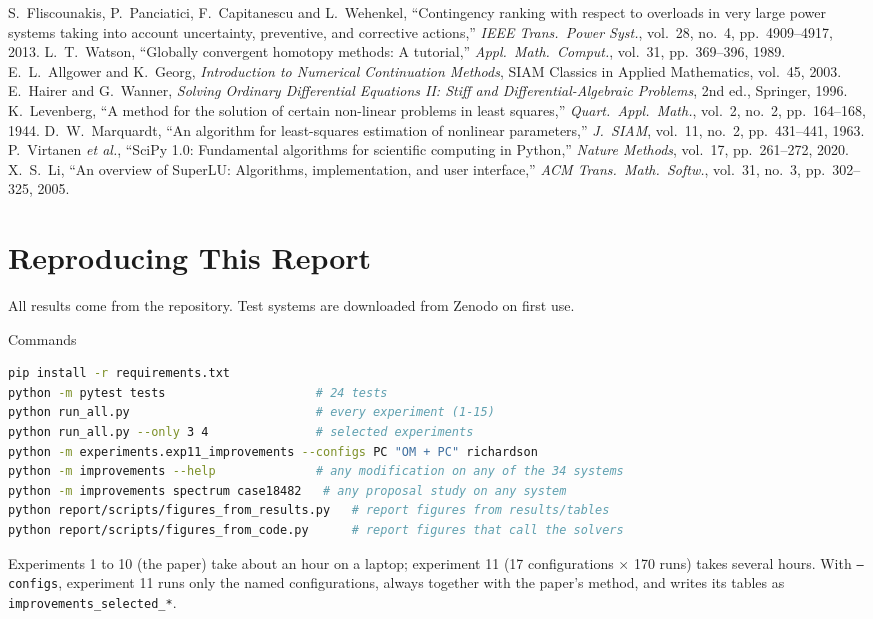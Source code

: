 \documentclass[11pt,a4paper]{article}
\newcommand{\code}[1]{\texttt{#1}}
\begin{document}
\begin{thebibliography}{99}
 S.~Fliscounakis, P.~Panciatici, F.~Capitanescu and L.~Wehenkel, ``Contingency ranking with
  respect to overloads in very large power systems taking into account uncertainty, preventive, and
  corrective actions,'' \emph{IEEE Trans.\ Power Syst.}, vol.~28, no.~4, pp.~4909--4917, 2013.
 L.~T.~Watson, ``Globally convergent homotopy methods: A tutorial,'' \emph{Appl.\ Math.\
  Comput.}, vol.~31, pp.~369--396, 1989.
 E.~L.~Allgower and K.~Georg, \emph{Introduction to Numerical Continuation Methods},
  SIAM Classics in Applied Mathematics, vol.~45, 2003.
 E.~Hairer and G.~Wanner, \emph{Solving Ordinary Differential Equations II: Stiff and
  Differential-Algebraic Problems}, 2nd ed., Springer, 1996.
 K.~Levenberg, ``A method for the solution of certain non-linear problems in least
  squares,'' \emph{Quart.\ Appl.\ Math.}, vol.~2, no.~2, pp.~164--168, 1944.
\bibitem{marquardt1963} D.~W.~Marquardt, ``An algorithm for least-squares estimation of nonlinear
  parameters,'' \emph{J.\ SIAM}, vol.~11, no.~2, pp.~431--441, 1963.
\bibitem{scipy} P.~Virtanen \emph{et al.}, ``SciPy 1.0: Fundamental algorithms for scientific computing in
  Python,'' \emph{Nature Methods}, vol.~17, pp.~261--272, 2020.
 X.~S.~Li, ``An overview of SuperLU: Algorithms, implementation, and user interface,''
  \emph{ACM Trans.\ Math.\ Softw.}, vol.~31, no.~3, pp.~302--325, 2005.
\end{thebibliography}

\clearpage
\appendix
\section{Reproducing This Report}\label{app:repro}
All results come from the repository. Test systems are downloaded from Zenodo on first use.
\begin{codebox}{Commands}
\begin{lstlisting}[language=bash,basicstyle=\ttfamily\footnotesize,numbers=none,columns=fullflexible]
pip install -r requirements.txt
python -m pytest tests                     # 24 tests
python run_all.py                          # every experiment (1-15)
python run_all.py --only 3 4               # selected experiments
python -m experiments.exp11_improvements --configs PC "OM + PC" richardson
python -m improvements --help              # any modification on any of the 34 systems
python -m improvements spectrum case18482   # any proposal study on any system
python report/scripts/figures_from_results.py   # report figures from results/tables
python report/scripts/figures_from_code.py      # report figures that call the solvers
\end{lstlisting}
\end{codebox}
Experiments 1 to 10 (the paper) take about an hour on a laptop; experiment 11 (17 configurations
$\times$ 170 runs) takes several hours. With \code{--configs}, experiment 11 runs only the named
configurations, always together with the paper's method, and writes its tables as
\code{improvements\_selected\_*}.
\end{document}

